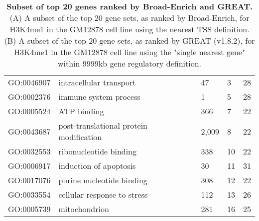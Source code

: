 \begin{table}[!ht]
\begin{tabular}{lllll}
GO:0046907     & intracellular transport                      & 47                         & 3                   & 28                          \\
GO:0002376     & immune system process                        & 1                          & 5                   & 28                          \\
GO:0005524     & ATP binding                                  & 366                        & 7                   & 22                          \\
GO:0043687     & post-translational protein modification      & 2,009                      & 8                   & 22                          \\
GO:0032553     & ribonucleotide binding                       & 338                        & 10                  & 22                          \\
GO:0006917     & induction of apoptosis                       & 30                         & 11                  & 31                          \\
GO:0017076     & purine nucleotide binding                    & 308                        & 12                  & 22                          \\
GO:0033554     & cellular response to stress                  & 112                        & 13                  & 26                          \\
GO:0005739     & mitochondrion                                & 281                        & 16                  & 25
\end{tabular}
\normalsize
\caption[Subset of top 20 genes ranked by Broad-Enrich and GREAT.]
{
\textbf{Subset of top 20 genes ranked by Broad-Enrich and GREAT.}
(A) A subset of the top 20 gene sets, as ranked by Broad-Enrich, for H3K4me1 in the GM12878 cell line using the nearest TSS definition. (B) A subset of the top 20 gene sets, as ranked by GREAT (v1.8.2), for H3K4me1 in the GM12878 cell line using the "single nearest gene" within 9999kb gene regulatory definition.
}
\label{chap2:table:11}

\end{table}

\newpage

